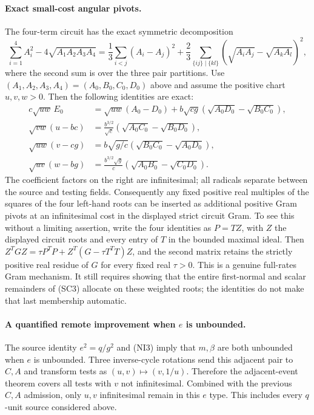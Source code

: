 \paragraph{Exact small-cost angular pivots.}
The four-term circuit has the exact symmetric decomposition
\[
 \sum_{i=1}^4A_i^2-4\sqrt{A_1A_2A_3A_4}
 =\frac13\sum_{i<j}(A_i-A_j)^2
  +\frac23\sum_{\{ij\}\mid\{kl\}}
       (\sqrt{A_iA_j}-\sqrt{A_kA_l})^2,
\]
where the second sum is over the three pair partitions. Use
$(A_1,A_2,A_3,A_4)=(A_0,B_0,C_0,D_0)$ above and assume the positive
chart $u,v,w>0$. Then the following identities are exact:
\[
\begin{aligned}
 c\sqrt{uw}\,E_0
 &=\sqrt{uw}(A_0-D_0)
      +b\sqrt{cg}(\sqrt{A_0D_0}-\sqrt{B_0C_0}),\\
 \sqrt{vw}(u-bc)
 &=\frac{b^{3/2}}{\sqrt c}
             (\sqrt{A_0C_0}-\sqrt{B_0D_0}),\\
 \sqrt{uw}(v-cg)
 &=b\sqrt{g/c}
             (\sqrt{B_0C_0}-\sqrt{A_0D_0}),\\
 \sqrt{uv}(w-bg)
 &=\frac{b^{3/2}\sqrt g}{c}
             (\sqrt{A_0B_0}-\sqrt{C_0D_0}).
\end{aligned}                                                     \tag{SC9}
\]
The coefficient factors on the right are infinitesimal; all radicals
separate between the source and testing fields. Consequently any fixed
positive real multiples of the squares of the four left-hand roots can
be inserted as additional positive Gram pivots at an infinitesimal cost
in the displayed strict circuit Gram. To see this without a limiting
assertion, write the four identities as $P=TZ$, with $Z$ the displayed
circuit roots and every entry of $T$ in the bounded maximal ideal. Then
$Z^TGZ=\tau P^TP+Z^T(G-\tau T^TT)Z$, and the second matrix retains
the strictly positive real residue of $G$ for every fixed real $\tau>0$.
This is a genuine full-rates Gram mechanism. It still requires showing
that the entire first-normal and scalar remainders of (SC3) allocate on
these weighted roots; the identities do not make that last membership
automatic.

\paragraph{A quantified remote improvement when $e$ is unbounded.}
The source identity $e^2=q/g^2$ and (NI3) imply that $m,\beta$ are
both unbounded when $e$ is unbounded. Three inverse-cycle rotations
send this adjacent pair to $C,A$ and transform tests as
$(u,v)\mapsto(v,1/u)$. Therefore the adjacent-event theorem covers
all tests with $v$ not infinitesimal. Combined with the previous
$C,A$ admission, only $u,v$ infinitesimal remain in this $e$ type.
This includes every $q$-unit source considered above.

